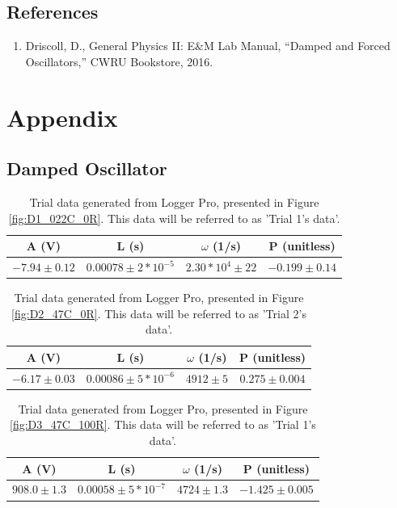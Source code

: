 \documentclass[12pt]{article}
\begin{document}
\subsection{References}
\begin{enumerate}
    \item Driscoll, D., General Physics II: E$\&$M Lab Manual, “Damped and Forced Oscillators,” CWRU Bookstore, 2016.
    \label{ref:MANUEL}
\end{enumerate}

\clearpage
\appendix
\section{Appendix}
\subsection{Damped Oscillator}

\begin{table}[h]
\centering
\begin{tabular}{|c|c|c|c|}
\hline
\textbf{A (V)} & \textbf{L (s)} & $\omega$ \textbf{(1/s)} & \textbf{P (unitless)} \\
\hline
$-7.94 \pm 0.12$  & $0.00078 \pm 2*10^{-5}$  & $2.30*10^4 \pm 22$ & $-0.199 \pm 0.14$ \\
\hline
\end{tabular}
\caption{Trial data generated from Logger Pro, presented in Figure \ref{fig:D1_022C_0R}. This data will be referred to as 'Trial 1's data'.}
\label{tab:damped_trial_1}
\end{table}

\begin{table}[h]
\centering
\begin{tabular}{|c|c|c|c|}
\hline
\textbf{A (V)} & \textbf{L (s)} & $\omega$ \textbf{(1/s)} & \textbf{P (unitless)} \\
\hline
$-6.17 \pm 0.03$  & $0.00086 \pm 5*10^{-6}$  & $4912 \pm 5$ & $0.275 \pm 0.004$ \\
\hline
\end{tabular}
\caption{Trial data generated from Logger Pro, presented in Figure \ref{fig:D2_47C_0R}. This data will be referred to as 'Trial 2's data'.}
\label{tab:damped_trial_2}
\end{table}

\begin{table}[h]
\centering
\begin{tabular}{|c|c|c|c|}
\hline
\textbf{A (V)} & \textbf{L (s)} & $\omega$ \textbf{(1/s)} & \textbf{P (unitless)} \\
\hline
$908.0 \pm 1.3$  & $0.00058 \pm 5*10^{-7}$  & $4724 \pm 1.3$ & $-1.425 \pm 0.005$ \\
\hline
\end{tabular}
\caption{Trial data generated from Logger Pro, presented in Figure \ref{fig:D3_47C_100R}. This data will be referred to as 'Trial 1's data'.}
\label{tab:damped_trial_3}
\end{table}
\end{document}
